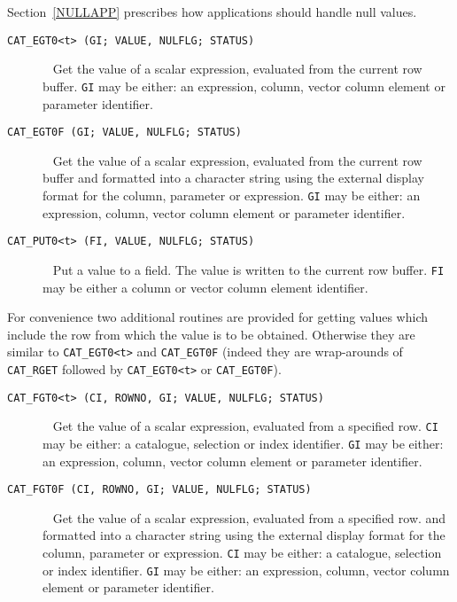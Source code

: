 \documentclass[11pt,twoside]{starlink}
\begin{document}
Section~\ref{NULLAPP} prescribes how applications should handle null
values.

\begin{description}

  \item[ \texttt{CAT\_EGT0<t> (GI; VALUE, NULFLG; STATUS) } ] ~
  \newline Get the value of a scalar expression, evaluated from the
   current row buffer. \texttt{GI} may be either: an expression, column,
   vector column element or parameter identifier.

  \item[ \texttt{CAT\_EGT0F (GI; VALUE, NULFLG; STATUS) } ] ~
  \newline Get the value of a scalar expression, evaluated from the
   current row buffer and formatted into a character string using the
   external display format for the column, parameter or expression. \texttt{GI} may be either: an expression, column, vector column element or
   parameter identifier.

  \item[ \texttt{CAT\_PUT0<t> (FI, VALUE, NULFLG; STATUS) } ] ~
  \newline Put a value to a field. The value is written to the current
   row buffer. \texttt{FI} may be either a column or vector column element
   identifier.

\end{description}

For convenience two additional routines are provided for getting
values which include the row from which the value is to be obtained.
Otherwise they are similar to \texttt{CAT\_EGT0<t>} and \texttt{CAT\_EGT0F}
(indeed they are wrap-arounds of \texttt{CAT\_RGET} followed by
\texttt{CAT\_EGT0<t>} or \texttt{CAT\_EGT0F}).

\begin{description}

  \item[ \texttt{CAT\_FGT0<t> (CI, ROWNO, GI; VALUE, NULFLG; STATUS) } ] ~
  \newline Get the value of a scalar expression, evaluated from a
   specified row. \texttt{CI} may be either: a catalogue, selection or
   index identifier. \texttt{GI} may be either: an expression, column,
   vector column element or parameter identifier.

  \item[ \texttt{CAT\_FGT0F (CI, ROWNO, GI; VALUE, NULFLG; STATUS) } ] ~
  \newline Get the value of a scalar expression, evaluated from a
   specified row. and formatted into a character string using the
   external display format for the column, parameter or expression. \texttt{CI} may be either: a catalogue, selection or index identifier. \texttt{GI} may be either: an expression, column, vector column element or
   parameter identifier.

\end{description}
\end{document}
